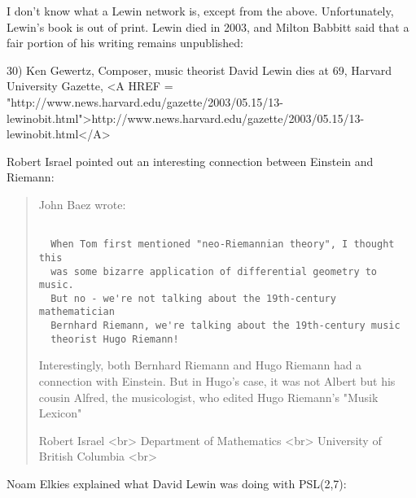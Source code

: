 I don't know what a Lewin network is, except from the above.  
Unfortunately, Lewin's book is out of print.  Lewin died 
in 2003, and Milton Babbitt
said that a fair portion of his writing remains unpublished:

30) Ken Gewertz, Composer, music theorist David Lewin dies at 69,
Harvard University Gazette, <A HREF = "http://www.news.harvard.edu/gazette/2003/05.15/13-lewinobit.html">http://www.news.harvard.edu/gazette/2003/05.15/13-lewinobit.html</A>

Robert Israel pointed out an interesting connection between
Einstein and Riemann:

\begin{quote}
John Baez wrote:


\begin{verbatim}

  When Tom first mentioned "neo-Riemannian theory", I thought this
  was some bizarre application of differential geometry to music.  
  But no - we're not talking about the 19th-century mathematician 
  Bernhard Riemann, we're talking about the 19th-century music 
  theorist Hugo Riemann!  
\end{verbatim}
    

Interestingly, both Bernhard Riemann and Hugo Riemann had a 
connection with Einstein.  But in Hugo's case, it was not Albert
but his cousin Alfred, the musicologist, who edited Hugo Riemann's
"Musik Lexicon"

Robert Israel  <br>
Department of Mathematics       <br>
University of British Columbia      <br>
\end{quote}



Noam Elkies explained what David Lewin was doing with PSL(2,7):

